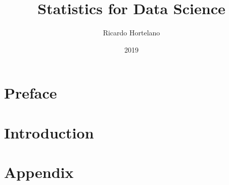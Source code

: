 \documentclass[12pt]{book}
\title{
{Statistics for Data Science}\\
}
\author{Ricardo Hortelano}
\date{2019}
\begin{document}
\maketitle

\chapter*{Preface}


\chapter{Introduction}


\appendix
\chapter{Appendix}


\printbibliography
\end{document}
